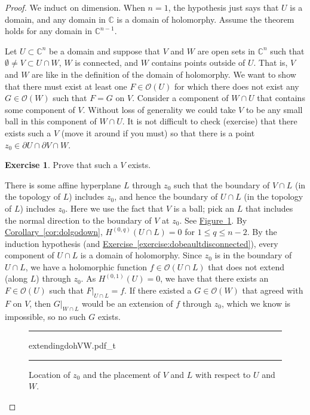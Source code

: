 \documentclass[12pt,openany]{book}
\newcommand{\C}{{\mathbb{C}}}
\newcommand{\sO}{{\mathscr{O}}}
\theoremstyle{plain}
\theoremstyle{remark}
\theoremstyle{definition}
\newenvironment{exbox}{%
    \def\FrameCommand{\vrule width 1pt \relax\hspace{10pt}}%
    \MakeFramed{\advance\hsize-\width\FrameRestore}%
}{%
    \endMakeFramed
}
\newenvironment{myfig}{%
\begin{figure}[h!t]
\noindent\rule{\textwidth}{0.5pt}\vspace{12pt}\par\centering}%
{\par\noindent\rule{\textwidth}{0.5pt}
\end{figure}}
\theoremstyle{exercise}
\newtheorem{exercise}{Exercise}[section]
\theoremstyle{example}
\newcommand{\figureref}[1]{\hyperref[#1]{Figure~\ref*{#1}}}
\newcommand{\exerciseref}[1]{\hyperref[#1]{Exercise~\ref*{#1}}}
\newcommand{\corref}[1]{\hyperref[#1]{Corollary~\ref*{#1}}}
\begin{document}
\begin{proof}
We induct on dimension.  When $n=1$, the hypothesis just says that
$U$ is a domain, and any domain in $\C$ is a domain of holomorphy.
Assume the theorem holds for any domain in $\C^{n-1}$.

Let $U \subset \C^n$ be a domain and
suppose that $V$ and $W$ are open sets in $\C^n$
such that $\emptyset \not= V \subset U \cap W$, $W$ is connected, and $W$ contains points outside
of $U$.  That is, $V$ and $W$ are like in the definition of the domain of
holomorphy.  We want to show that there must exist at least one $F \in
\sO(U)$ for which there does not exist any $G \in \sO(W)$ such that $F=G$ on
$V$.
Consider a component of $W \cap U$ that contains some component of $V$.
Without loss of generality we could take $V$ to be any small ball in this
component of $W \cap U$.
It is not difficult to check (exercise) that there exists such a $V$
(move it around if you must)
so that there is a point $z_0 \in \partial U \cap \partial V \cap W$.

\begin{exbox}
\begin{exercise}
Prove that such a $V$ exists.
\end{exercise}
\end{exbox}

There is some affine hyperplane $L$ through $z_0$ such that
the boundary of $V \cap L$ (in the topology of $L$) includes $z_0$,
and hence the boundary of $U \cap L$ (in the topology of $L$)
includes $z_0$.
Here we use the fact that $V$ is a ball; pick an $L$ that includes the
normal direction to the boundary of $V$ at $z_0$.  See
\figureref{fig:extendingdohVW}.
By \corref{cor:dolgodown},
$H^{(0,q)}(U \cap L) = 0$ for $1 \leq q \leq n-2$.
By the induction hypothesis
(and \exerciseref{exercise:dobeaultdisconnected}),
every component of $U \cap L$ is a domain of holomorphy.
Since $z_0$ is in the boundary of $U \cap L$, we have a holomorphic function
$f \in \sO(U \cap L)$ that does not extend (along $L$) through $z_0$.
As $H^{(0,1)}(U) = 0$, we have that there exists an $F \in \sO(U)$
such that $F|_{U \cap L} = f$.  If there existed a $G \in \sO(W)$ that
agreed with $F$ on $V$, then $G|_{W \cap L}$ would be an extension of $f$
through $z_0$, which we know is impossible, so no such $G$ exists.
\begin{myfig}
{extendingdohVW.pdf_t}
\caption{Location of $z_0$ and the placement of $V$ and $L$ with
respect to $U$ and $W$.\label{fig:extendingdohVW}}
\end{myfig}
\end{proof}
\end{document}
